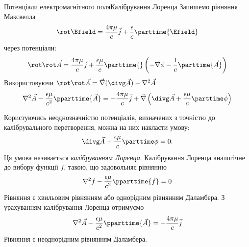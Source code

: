 \documentclass[9pt]{beamer}
\let\vect\vec
\begin{document}
\begin{frame}{Потенціали електромагнітного поля}{Калібрування Лоренца}
	Запишемо рівняння Максвелла
	\begin{equation*}
		\rot\Bfield = \frac{4\pi\mu}{c}\vect{j} + \frac{\epsilon}{c}\parttime{\Efield}
	\end{equation*}
	через потенціали:
	\begin{equation*}
		\rot\rot\vect{A} = \frac{4\pi\mu}{c}\vect{j} + \frac{\epsilon\mu}{c} \parttime{}\left( - \vect{\nabla}\phi - \frac1c\parttime{\vect{A}}\right)
	\end{equation*}
	Використовуючи $ \rot\rot\vect{A} =   \vect{\nabla}(\divg\vect{A}) - \nabla^2\vect{A}$
	\begin{equation*}
		\nabla^2\vect{A} - \frac{ \epsilon\mu }{c^2} \pparttime{\vect{A}} = - \frac{4\pi\mu}{c}\vect{j} + \vect{\nabla}\left( \divg\vect{A} + \frac{\epsilon\mu}{c} \parttime\phi\right)
	\end{equation*}

	\begin{overprint}
		Користуючись неоднозначністю потенціалів, визначених з
		точністю до калібрувального перетворення, можна на них накласти умову:
		\begin{equation*}
			\divg\vect{A} + \frac{\epsilon\mu}{c} \parttime\phi = 0.
		\end{equation*}
		Ця умова називається \emph{калібруванням Лоренца}.
		\onslide<2>
		Калібрування Лоренца аналогічне до вибору функції $ f $, такою, що задовольняє рівнянню
		\begin{equation*}
			\nabla^2 f - \frac{ \epsilon\mu }{c^2} \pparttime{f} = 0
		\end{equation*}
		{\scriptsize Рівняння є хвильовим рівнянням або однорідним рівнянням Даламбера.}
		\onslide<3>
		З урахуванням калібрування Лоренца отримуємо
		\begin{equation*}
			\nabla^2\vect{A} - \frac{ \epsilon\mu }{c^2} \pparttime{\vect{A}} = - \frac{4\pi\mu}{c}\vect{j}
		\end{equation*}
		{\scriptsize Рівняння є неоднорідним рівнянням Даламбера.}
	\end{overprint}
\end{frame}
\end{document}
